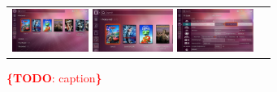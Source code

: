 \documentclass{acm_proc_article-sp}
\newcommand{\todo}[1]{\noindent\textcolor{red}{{\bf \{TODO}: #1{\bf \}}}}
\newcommand{\thumbheight}{14mm}
\newcommand{\newstrip}{\newline\vspace{-1em}\newline}
\newenvironment{thumbsequence}{}{\makebox[4mm]{}}
\begin{document}
\begin{figure}
\begin{tabular}{p{}p{}}
\begin{thumbsequence}
		\newstrip
		\includegraphics[height=\thumbheight]{resources/ubuntu/looseduplicate3.jpg}
		\includegraphics[height=\thumbheight]{resources/ubuntu/looseduplicate4.jpg}
		\newstrip
		\includegraphics[height=\thumbheight]{resources/ubuntu/looseduplicate5.png}
	\end{thumbsequence}
\end{tabular}
\caption{\todo{caption}}
\label{fig:sequences}
\end{figure}

\clearpage
\end{document}
